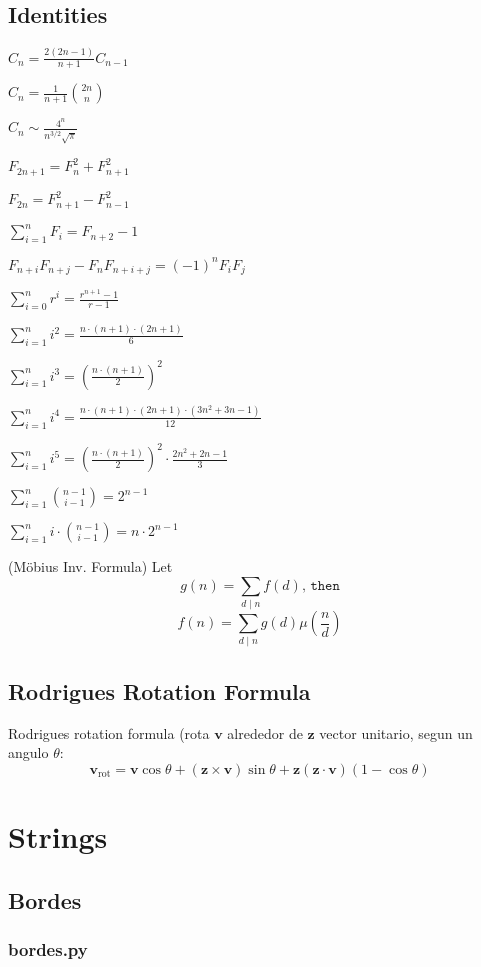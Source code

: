 \documentclass{article}
\newcommand\codefile[2]{    
    \subsubsection{#2}
    
    
}
\begin{document}
\begin{multicols*}{2}
\subsection{Identities}
    $C_n = \frac{2(2n-1)}{n+1} C_{n-1}$

    $C_n = \frac{1}{n+1} \binom{2n}{n}$

    $C_n \sim \frac{4^n}{n^{3/2}\sqrt{\pi}}$

    $F_{2n+1} = F_{n}^2 + F_{n+1}^2$

    $F_{2n} = F_{n+1}^2 - F_{n-1}^2$

    $\sum_{i=1}^n F_i = F_{n+2}-1$

    $F_{n+i}F_{n+j} - F_nF_{n+i+j} = (-1)^n F_iF_j$

    $\sum_{i=0}^n{r^i} = \frac{r^{n+1}-1}{r-1}$
    
    $\sum_{i=1}^n{i^2} = \frac{n\cdot(n+1)\cdot(2n+1)}{6}$

    $\sum_{i=1}^n{i^3} = \left(\frac{n\cdot(n+1)}{2}\right)^2$

    $\sum_{i=1}^n{i^4} = \frac{n\cdot(n+1)\cdot(2n+1)\cdot(3n^2+3n-1)}{12}$

    $\sum_{i=1}^{ n} i^5 = \left(\frac{ n \cdot (n+1)}{2}\right) ^2 \cdot \frac{2 n ^2 + 2n - 1}{3}$

    $\sum_{i=1}^n{\binom{n-1}{i-1}} = 2^{n-1}$

    $\sum_{i=1}^n{i\cdot\binom{n-1}{i-1}} = n\cdot2^{n-1}$

    (Möbius Inv. Formula)
    Let
    \[g(n) = \sum_{d\mid n} f(d) \texttt{, then}\]
    \[f(n)=\sum_{d\mid n} g(d) \mu\left(\frac{n}{d}\right)\]


\subsection{Rodrigues Rotation Formula}
Rodrigues rotation formula (rota $\mathbf{v}$ alrededor de $\mathbf{z}$ vector unitario, segun un angulo $\theta$:
$$\mathbf{v}_\mathrm{rot} = \mathbf{v} \cos\theta + (\mathbf{z} \times \mathbf{v})\sin\theta   + \mathbf{z} (\mathbf{z} \cdot \mathbf{v}) (1 - \cos\theta)$$

\section{Strings}

\subsection{Bordes}
\codefile{strings/bordes.py}{bordes.py}


\end{multicols*}
\end{document}
